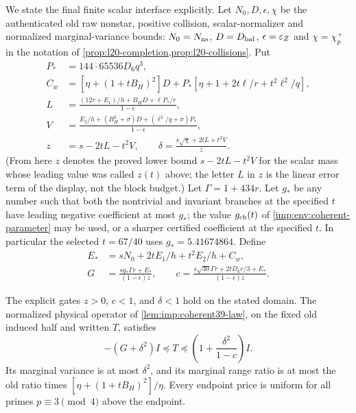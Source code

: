 We state the final finite scalar interface explicitly.  Let $N_0,D,
\epsilon,\chi$ be the authenticated old raw nonstar, positive collision,
scalar-normalizer and normalized marginal-variance bounds:
$N_0=N_{\rm ns}$, $D=D_{\rm bal}$, $\epsilon=\varepsilon_Z$ and
$\chi=\chi_p^+$ in the notation of
\cref{prop:l20-completion,prop:l20-collisions}. Put
\begin{align}
 P_*&=144\cdot65536D_6q^3,\nonumber\\
 C_w&=[\eta+(1+tB_H)^2]D
       +P_*[\eta+1+2t\ell/r+t^2\ell^2/q],\nonumber\\
 L&=\frac{(12r+E_1)/h+B_HD+\ell P_*/r}{1-\epsilon},\nonumber\\
 V&=\frac{E_2/h+(B_H^2+\sigma)D+(\ell^2/q+\sigma)P_*}
                  {1-\epsilon},\nonumber\\
 z&=s-2tL-t^2V,\qquad
 \delta=\frac{s\sqrt\chi+2tL+t^2V}{z}.
 \label{imp:env:coherent-normalization}
\end{align}
(From here $z$ denotes the proved lower bound $s-2tL-t^2V$ for the scalar mass whose leading value was called $z(t)$ above; the letter $L$ in $z$ is the linear error term of the display, not the block budget.) Let $\Gamma=1+434r$. Let $g_*$ be any number such that both the
nontrivial and invariant branches at the specified $t$ have
leading negative coefficient at most $g_*$; the value
$g_{\rm ch}(t)$ of \cref{imp:env:coherent-parameter} may be
used, or a sharper certified coefficient
at the specified $t$. In particular the selected
$t=67/40$ uses $g_*=5.41674864$. Define
\begin{align}
 E_*&=sN_0+2tE_1/h+t^2E_2/h+C_w,\nonumber\\
 G&=\frac{s g_*\Gamma r+E_*}{(1-\epsilon)z},\qquad
 c=\frac{s\sqrt{30}\Gamma r+2tD_6r/3+E_*}{(1-\epsilon)z}.
 \label{imp:env:coherent-final-prices}
\end{align}

\begin{proposition}
\label{imp:env:finite-coherent-chamber}
The explicit gates $z>0$, $c<1$, and $\delta<1$ hold on the stated
domain.  The normalized physical operator of
\cref{lem:imp:coherent39-law}, on the fixed old induced half and written $T$, satisfies
\[
 -(G+\delta^2)I\preceq T
 \preceq\left(1+\frac{\delta^2}{1-c}\right)I.
\]
Its marginal variance is at most $\delta^2$, and its marginal range
ratio is at most the old ratio times
$[\eta+(1+tB_H)^2]/\eta$.  Every endpoint price is uniform for all
primes $p\equiv3\pmod4$ above the endpoint.
\end{proposition}

